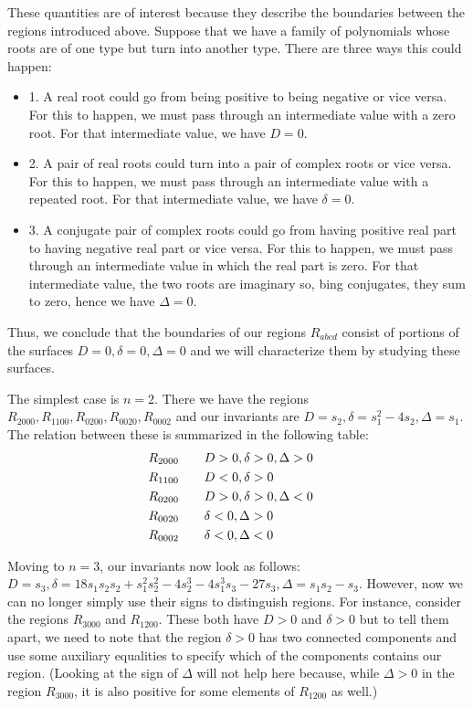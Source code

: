 \documentclass{amsart}
\theoremstyle{definition}
\theoremstyle{remark}
\numberwithin{equation}{section}
\begin{document}
These quantities are of interest because they describe the boundaries
between the regions introduced above.  Suppose that we have a family
of polynomials whose roots are of one type but turn into another type.
There are three ways this could happen:
\begin{itemize}
\item{1.} A real root could go from being positive to being negative
  or vice versa.  For this to happen, we must pass through an
  intermediate value with a zero root.  For that intermediate value,
  we have $D = 0$.
\item{2.} A pair of real roots could turn into a pair of complex roots
  or vice versa.  For this to happen, we must pass through an
  intermediate value with a repeated root.  For that intermediate
  value, we have $\delta = 0$.
\item{3.} A conjugate pair of complex roots could go from having
  positive real part to having negative real part or vice versa.  For
  this to happen, we must pass through an intermediate value in which
  the real part is zero.  For that intermediate value, the two roots
  are imaginary so, bing conjugates, they sum to zero, hence we have
  $\Delta = 0$.
\end{itemize}
\noindent  Thus, we conclude that the boundaries of our regions
$R_{abcd}$ consist of portions of the surfaces $D=0, \delta=0,
\Delta=0$ and we will characterize them by studying these surfaces.

The simplest case is $n=2$.  There we have the regions $R_{2000},
R_{1100}, R_{0200}, R_{0020}, R_{0002}$ and our invariants are $D =
s_2, \delta = s_1^2 - 4s_2, \Delta = s_1$.  The relation between these
is summarized in the following table:
\begin{align}
R_{2000} \qquad &D > 0, \delta > 0, \Delta > 0 \cr
R_{1100} \qquad &D < 0, \delta > 0 \cr  
R_{0200} \qquad &D > 0, \delta > 0, \Delta < 0 \cr
R_{0020} \qquad &\delta < 0, \Delta > 0 \cr 
R_{0002} \qquad &\delta < 0, \Delta < 0 \cr
\end{align}

Moving to $n=3$, our invariants now look as follows: $D = s_3, \delta
= 18 s_1 s_2 s_2 + s_1^2 s_2^2 - 4 s_2^3 - 4 s_1^3 s_3 - 27 s_3,
\Delta = s_1 s_2 - s_3$.  However, now we can no longer simply use their
signs to distinguish regions.  For instance, consider the regions
$R_{3000}$ and $R_{1200}$.  These both have $D > 0$ and $\delta > 0$
but to tell them apart, we need to note that the region $\delta > 0$
has two connected components and use some auxiliary equalities to
specify which of the components contains our region.  (Looking at the
sign of $\Delta$ will not help here because, while $\Delta > 0$ in the
region $R_{3000}$, it is also positive for some elements of $R_{1200}$
as well.)
\end{document}
